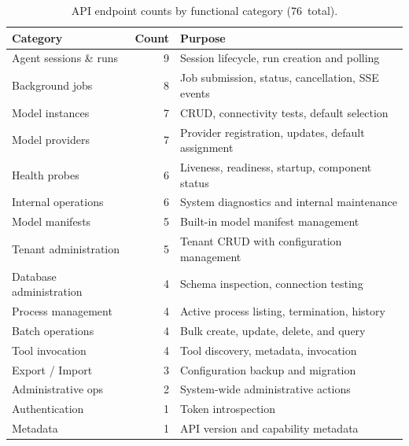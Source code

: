\documentclass[a4paper,noexaminfo]{sapthesis}
\begin{document}
\begin{table}[ht]
\centering
\caption{API endpoint counts by functional category (76~total).}
\label{tab:app-api-summary}
\small
\begin{tabularx}{\textwidth}{@{}l r X@{}}
    \hline
    \textbf{Category} & \textbf{Count} & \textbf{Purpose} \\
    \hline
    Agent sessions \& runs  & 9 & Session lifecycle, run creation and polling \\
    Background jobs         & 8 & Job submission, status, cancellation, SSE events \\
    Model instances         & 7 & CRUD, connectivity tests, default selection \\
    Model providers         & 7 & Provider registration, updates, default assignment \\
    Health probes           & 6 & Liveness, readiness, startup, component status \\
    Internal operations     & 6 & System diagnostics and internal maintenance \\
    Model manifests         & 5 & Built-in model manifest management \\
    Tenant administration   & 5 & Tenant CRUD with configuration management \\
    Database administration & 4 & Schema inspection, connection testing \\
    Process management      & 4 & Active process listing, termination, history \\
    Batch operations        & 4 & Bulk create, update, delete, and query \\
    Tool invocation         & 4 & Tool discovery, metadata, invocation \\
    Export / Import         & 3 & Configuration backup and migration \\
    Administrative ops      & 2 & System-wide administrative actions \\
    Authentication          & 1 & Token introspection \\
    Metadata                & 1 & API version and capability metadata \\
    \hline
\end{tabularx}
\end{table}
\end{document}
